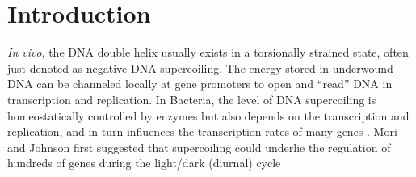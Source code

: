 \documentclass[10pt,a4]{article}
\begin{document}
\section{Introduction}
\textit{In vivo}, the DNA double helix usually exists in a torsionally
strained state, often just denoted as negative DNA supercoiling.  The
energy stored in underwound DNA can be channeled locally at gene
promoters to open and ``read'' DNA in transcription and replication.
In Bacteria, the level of DNA supercoiling is homeostatically controlled by
enzymes but also depends on the transcription and replication, and
in turn influences the transcription rates of many genes \cite{Dorman2019}. 
%
%
%
Mori and Johnson first suggested that supercoiling could underlie the
regulation of hundreds of genes during the light/dark (diurnal) cycle
\end{document}
